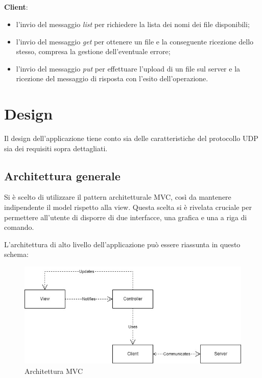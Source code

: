 \documentclass[a4paper,12pt]{report}
\begin{document}
\paragraph{}
\textbf{Client}:
\begin{itemize}
    \item l’invio del messaggio \textit{list} per richiedere la lista dei nomi dei file disponibili;
    \item l’invio del messaggio \textit{get} per ottenere un file e la conseguente ricezione dello stesso, compresa la gestione dell’eventuale errore;
    \item l’invio del messaggio \textit{put} per effettuare l’upload di un file sul server e la ricezione del messaggio di risposta con l’esito dell’operazione.
\end{itemize}

\chapter{Design}
Il design dell'applicazione tiene conto sia delle caratteristiche del protocollo UDP sia dei requisiti sopra dettagliati. 

\section{Architettura generale}
Si è scelto di utilizzare il pattern architetturale MVC, così da mantenere indipendente il model rispetto alla view. Questa scelta si è rivelata cruciale per permettere all'utente di disporre di due interfacce, una grafica e una a riga di comando.

L'architettura di alto livello dell'applicazione può essere riassunta in questo schema:
\begin{figure}[H]
    \centering
    \includegraphics[width=\textwidth]{img/arch.jpg}
    \caption{Architettura MVC}
\end{figure}
\end{document}
